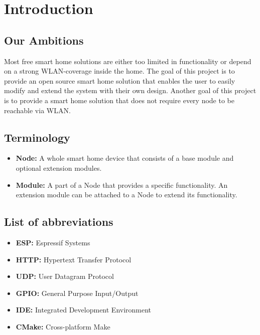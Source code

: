 \chapter{Introduction}
\renewcommand*\chapterpagestyle{scrheadings}

    \section{Our Ambitions}
        Most free smart home solutions are either too limited in
        functionality or depend on a strong WLAN-coverage inside the
        home.
        The goal of this project is to provide an open source
        smart home solution that enables the user to easily modify 
        and extend the system with their own design. Another goal of
        this project is to provide a smart home solution that does
        not require every node to be reachable via WLAN.

    \section{Terminology}
        \begin{itemize}
            \item \textbf{Node:} A whole smart home device that
            consists of a base module and optional extension modules.

            \item \textbf{Module:} A part of a Node that provides
            a specific functionality. An extension module can be
            attached to a Node to extend its functionality.

        \end{itemize}

    \section{List of abbreviations}
        \begin{itemize}
            \item \textbf{ESP:} Espressif Systems
            \item \textbf{HTTP:} Hypertext Transfer Protocol
            \item \textbf{UDP:} User Datagram Protocol
            \item \textbf{GPIO:} General Purpose Input/Output
            \item \textbf{IDE:} Integrated Development Environment
            \item \textbf{CMake:} Cross-platform Make
        \end{itemize}


    